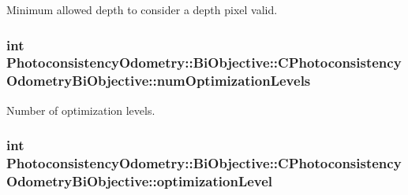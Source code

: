 \label{class_photoconsistency_odometry_1_1_bi_objective_1_1_c_photoconsistency_odometry_bi_objective_adec531c1211633911c26103389dc3a8a}
Minimum allowed depth to consider a depth pixel valid. \hypertarget{class_photoconsistency_odometry_1_1_bi_objective_1_1_c_photoconsistency_odometry_bi_objective_a446eabe1e440d02158f2333fa19263fb}{
\subsubsection[{numOptimizationLevels}]{\setlength{\rightskip}{0pt plus 5cm}int {\bf PhotoconsistencyOdometry::BiObjective::CPhotoconsistencyOdometryBiObjective::numOptimizationLevels}}}
\label{class_photoconsistency_odometry_1_1_bi_objective_1_1_c_photoconsistency_odometry_bi_objective_a446eabe1e440d02158f2333fa19263fb}
Number of optimization levels. \hypertarget{class_photoconsistency_odometry_1_1_bi_objective_1_1_c_photoconsistency_odometry_bi_objective_a091fe96422095cde49e8dbf0f588c68f}{
\subsubsection[{optimizationLevel}]{\setlength{\rightskip}{0pt plus 5cm}int {\bf PhotoconsistencyOdometry::BiObjective::CPhotoconsistencyOdometryBiObjective::optimizationLevel}}}
\label{class_photoconsistency_odometry_1_1_bi_objective_1_1_c_photoconsistency_odometry_bi_objective_a091fe96422095cde49e8dbf0f588c68f}
